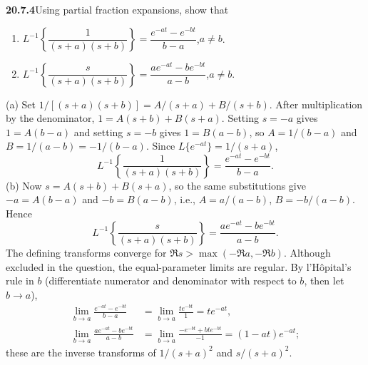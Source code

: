 \par\bigskip
\noindent\textbf{20.7.4}\quad Using partial fraction expansions,
show that
\begin{enumerate}
\item[(a)] $L^{-1}\left\{\dfrac{1}{(s+a)(s+b)}\right\}
=\dfrac{e^{-at}-e^{-bt}}{b-a}$,\quad $a\ne b$.
\item[(b)] $L^{-1}\left\{\dfrac{s}{(s+a)(s+b)}\right\}
=\dfrac{ae^{-at}-be^{-bt}}{a-b}$,\quad $a\ne b$.
\end{enumerate}
\solution
(a) Set $1/[(s+a)(s+b)]=A/(s+a)+B/(s+b)$.
After multiplication by the denominator,
$1=A(s+b)+B(s+a)$. Setting $s=-a$ gives $1=A(b-a)$ and
setting $s=-b$ gives $1=B(a-b)$, so
$A=1/(b-a)$ and $B=1/(a-b)=-1/(b-a)$. Since
$L\{e^{-at}\}=1/(s+a)$,
\[
\boxed{L^{-1}\left\{\frac1{(s+a)(s+b)}\right\}
=\frac{e^{-at}-e^{-bt}}{b-a}}.
\]
(b) Now $s=A(s+b)+B(s+a)$, so the same substitutions give
$-a=A(b-a)$ and $-b=B(a-b)$, i.e.,
$A=a/(a-b)$, $B=-b/(a-b)$. Hence
\[
\boxed{L^{-1}\left\{\frac{s}{(s+a)(s+b)}\right\}
=\frac{ae^{-at}-be^{-bt}}{a-b}}.
\]
The defining transforms converge for
$\Re s>\max(-\Re a,-\Re b)$. Although excluded in the
question, the equal-parameter limits are regular. By
l'H\^opital's rule in $b$ (differentiate numerator and
denominator with respect to $b$, then let $b\to a$),
\begin{align*}
\lim_{b\to a}\frac{e^{-at}-e^{-bt}}{b-a}
&=\lim_{b\to a}\frac{te^{-bt}}1=te^{-at},\\
\lim_{b\to a}\frac{ae^{-at}-be^{-bt}}{a-b}
&=\lim_{b\to a}\frac{-e^{-bt}+bte^{-bt}}{-1}=(1-at)e^{-at};
\end{align*}
these are the inverse transforms of $1/(s+a)^2$ and
$s/(s+a)^2$.

